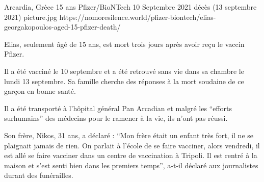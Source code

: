 {Arcardia, Grèce}
{15 ans}
{Pfizer/BioNTech}
{10 Septembre 2021}
{décès (13 septembre 2021)}
{picture.jpg}
{https://nomoresilence.world/pfizer-biontech/elias-georgakopoulos-aged-15-pfizer-death/}
{

Elias, seulement âgé de 15 ans, est mort trois jours après avoir reçu le vaccin Pfizer.

Il a été vacciné le 10 septembre et a été retrouvé sans vie dans sa chambre le
lundi 13 septembre. Sa famille cherche des réponses à la mort soudaine de ce
garçon en bonne santé.

Il a été transporté à l'hôpital général Pan Arcadian et malgré les “efforts
surhumains” des médecins pour le ramener à la vie, ils n'ont pas réussi.

Son frère, Nikos, 31 ans, a déclaré : “Mon frère était un enfant très fort, il
ne se plaignait jamais de rien. On parlait à l'école de se faire vacciner, alors
vendredi, il est allé se faire vacciner dans un centre de vaccination à
Tripoli. Il est rentré à la maison et s'est senti bien dans les premiers temps”,
a-t-il déclaré aux journalistes durant des funérailles.

}
